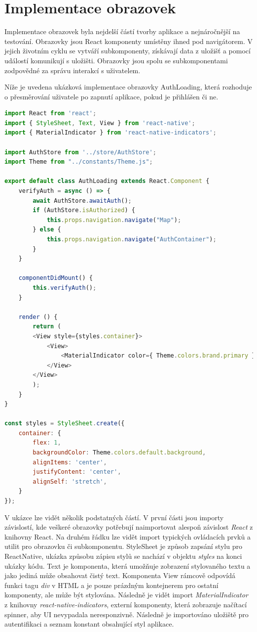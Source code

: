 \section{Implementace obrazovek}

Implementace obrazovek byla nejdelší částí tvorby aplikace a nejnáročnější na testování. Obrazovky jsou React komponenty umístěny ihned pod navigátorem. V jejich životním cyklu se vytváří subkomponenty, získávají data z uložišť a pomocí událostí komunikují s uložišti. Obrazovky jsou spolu se subkomponentami zodpovědné za správu interakcí s uživatelem.

Níže je uvedena ukázková implementace obrazovky AuthLoading, která rozhoduje o přesměrování uživatele po zapnutí aplikace, pokud je přihlášen či ne.

\begin{lstlisting}[language=JavaScript, caption=Ukázka implementace obrazovky]
import React from 'react';
import { StyleSheet, Text, View } from 'react-native';
import { MaterialIndicator } from 'react-native-indicators';

import AuthStore from '../store/AuthStore';
import Theme from "../constants/Theme.js";

export default class AuthLoading extends React.Component {
	verifyAuth = async () => {
		await AuthStore.awaitAuth();
		if (AuthStore.isAuthorized) {
			this.props.navigation.navigate("Map");
		} else {
			this.props.navigation.navigate("AuthContainer");
		}
	}
	
	componentDidMount() {
		this.verifyAuth();
	}
	
	render () {
		return (
		<View style={styles.container}>
			<View>
				<MaterialIndicator color={ Theme.colors.brand.primary }/>
			</View>
		</View>
		);
	}
}

const styles = StyleSheet.create({
	container: {
		flex: 1,
		backgroundColor: Theme.colors.default.background,
		alignItems: 'center',
		justifyContent: 'center',
		alignSelf: 'stretch',
	}
});

\end{lstlisting}

V ukázce lze vidět několik podstatných částí. V první části jsou importy závislostí, kde veškeré obrazovky potřebují naimportovat alespoň závislost \emph{React} z knihovny React. Na druhém řádku lze vidět import typických ovládacích prvků a utilit pro obrazovku či subkomponentu. StyleSheet je způsob zapsání stylu pro ReactNative, ukázka způsobu zápisu stylů se nachází v objektu \emph{styles} na konci ukázky kódu. Text je komponenta, která umožňuje zobrazení stylovaného textu a jako jediná může obsahovat čistý text. Komponenta View rámcově odpovídá funkci tagu \emph{div} v HTML a je pouze prázdným kontejnerem pro ostatní komponenty, ale může být stylována. Následně je vidět import \emph{MaterialIndicator} z knihovny \emph{react-native-indicators}, externí komponenty, která zobrazuje načítací spinner, aby UI nevypadala neresponzivně. Následně je importováno uložiště pro autentifikaci a seznam konstant obsahující styl aplikace.

